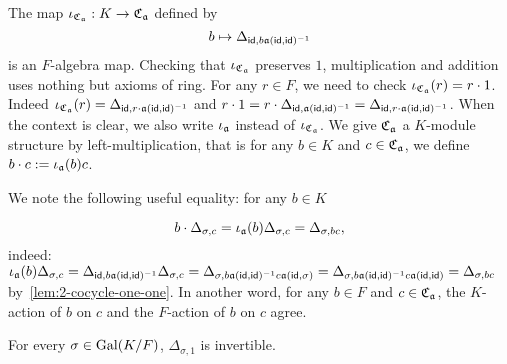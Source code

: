 \begin{construction}[$K$-embedding]\label{con:cross-product-iota}
  The map $\iota_{\operatorname{\mathfrak{C}}_{\mathfrak{a}}}: K \to \operatorname{\mathfrak{C}}_{\mathfrak{a}}$ defined by
  \[
    b \mapsto \Delta_{\mathsf{id}, b\mathfrak{a}(\mathsf{id},\mathsf{id})^{-1}}
  \]
  is an $F$-algebra map.
  Checking that $\iota_{\operatorname{\mathfrak{C}}_{\mathfrak{a}}}$ preserves $1$, multiplication and addition uses nothing but axioms of ring.
  For any $r \in F$, we need to check $\iota_{\operatorname{\mathfrak{C}}_{\mathfrak{a}}}(r) = r \cdot 1$. Indeed $\iota_{\operatorname{\mathfrak{C}}_{\mathfrak{a}}}(r) = \Delta_{\mathsf{id}, r\cdot \mathfrak{a}(\mathsf{id},\mathsf{id})^{-1}}$ and $r\cdot 1 = r \cdot \Delta_{\mathsf{id},\mathfrak{a}(\mathsf{id},\mathsf{id})^{-1}} =\Delta_{\mathsf{id},r\cdot\mathfrak{a}(\mathsf{id},\mathsf{id})^{-1}}$.
  When the context is clear, we also write $\iota_{\mathfrak{a}}$ instead of $\iota_{\operatorname{\mathfrak{C}}_{\mathfrak{a}}}$. We give $\operatorname{\mathfrak{C}}_{\mathfrak{a}}$ a $K$-module structure by left-multiplication, that is for any $b \in K$ and $c\in\operatorname{\mathfrak{C}}_{\mathfrak{a}}$, we define $b\cdot c := \iota_{\mathfrak{a}}(b)c$.


  We note the following useful equality: for any $b \in K$

  \[
    b\cdot \Delta_{\sigma,c} = \iota_{\mathfrak{a}}(b)\Delta_{\sigma, c} = \Delta_{\sigma, bc},
  \]
  indeed:
  $\iota_{\mathfrak{a}}(b)\Delta_{\sigma, c} = \Delta_{\mathsf{id},b \mathfrak{a}(\mathsf{id},\mathsf{id})^{-1}}\Delta_{\sigma, c} = \Delta_{\sigma, b\mathfrak{a}(\mathsf{id},\mathsf{id})^{-1}c\mathfrak{a}(\mathsf{id},\sigma)} = \Delta_{\sigma,b\mathfrak{a}(\mathsf{id},\mathsf{id})^{-1}c\mathfrak{a}(\mathsf{id},\mathsf{id})} = \Delta_{\sigma, bc}$ by~\cref{lem:2-cocycle-one-one}. In another word, for any $b \in F$ and $c \in \operatorname{\mathfrak{C}}_{\mathfrak{a}}$, the $K$-action of $b$ on $c$ and the $F$-action of $b$ on $c$ agree.

   \leanok {}
 \end{construction}

 \begin{lemma}
   \label{lem:cross-product-delta-invertible}
   For every $\sigma \in \operatorname{Gal}(K/F)$, $\Delta_{\sigma,1}$ is invertible.
   \leanok
 \end{lemma}

